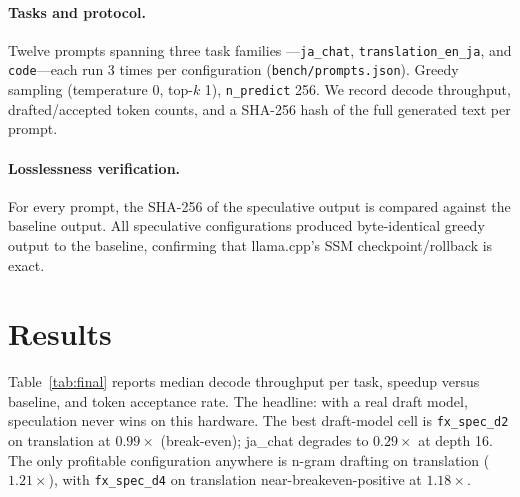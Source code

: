 \documentclass[10pt]{article}
\newcommand{\code}[1]{\texttt{#1}}
\begin{document}
\paragraph{Tasks and protocol.} Twelve prompts spanning three task families
---\code{ja\_chat}, \code{translation\_en\_ja}, and \code{code}---each run
3 times per configuration (\code{bench/prompts.json}). Greedy sampling
(temperature 0, top-$k$ 1), \code{n\_predict} 256. We record decode
throughput, drafted/accepted token counts, and a SHA-256 hash of the full
generated text per prompt.

\paragraph{Losslessness verification.} For every prompt, the SHA-256 of the
speculative output is compared against the baseline output. All speculative
configurations produced byte-identical greedy output to the baseline,
confirming that llama.cpp's SSM checkpoint/rollback is exact.

\section{Results}
\label{sec:results}

Table~\ref{tab:final} reports median decode throughput per task, speedup
versus baseline, and token acceptance rate. The headline: with a real draft
model, speculation never wins on this hardware. The best draft-model cell
is \code{fx\_spec\_d2} on translation at $0.99\times$ (break-even);
ja\_chat degrades to $0.29\times$ at depth 16. The only profitable
configuration anywhere is n-gram drafting on translation ($1.21\times$),
with \code{fx\_spec\_d4} on translation near-breakeven-positive at
$1.18\times$.
\end{document}
